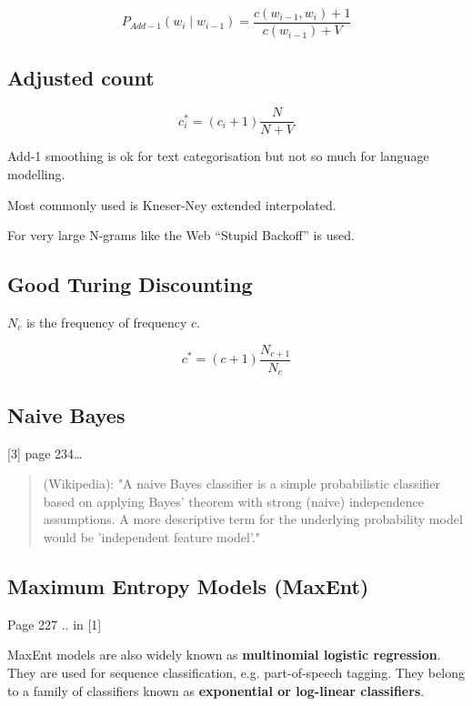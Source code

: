 \begin{equation}
  P_{Add-1}(w_i \mid w_{i-1}) = \frac{c(w_{i-1}, w_i) + 1}{c(w_{i-1}) + V}
  \label{eq:padd1}
\end{equation}

\subsection*{Adjusted count}

\begin{equation}
  c_i^* = (c_i+1)\frac{N}{N+V}
  \label{eq:ci}
\end{equation}

Add-1 smoothing is ok for text categorisation but not so much for language modelling.

Most commonly used is Kneser-Ney extended interpolated.

For very large N-grams like the Web “Stupid Backoff” is used.

\subsection*{Good Turing Discounting}

$N_c$ is the frequency of frequency $c$.

\begin{equation}
  c^* = (c+1)\frac{N_{c+1}}{N_c}
  \label{eq:cstar}
\end{equation}

\subsection*{Naive Bayes}

[3] page 234…

\begin{quote}
  (Wikipedia): "A naive Bayes classifier is a simple probabilistic classifier based on applying Bayes' theorem with strong (naive) independence assumptions. A more descriptive term for the underlying probability model would be 'independent feature model'."
\end{quote}

\subsection*{Maximum Entropy Models (MaxEnt)}

Page 227 .. in [1]

MaxEnt models are also widely known as \textbf{multinomial logistic regression}. They are used for sequence classification, e.g. part-of-speech tagging. They belong to a family of classifiers known as \textbf{exponential or log-linear classifiers}.

